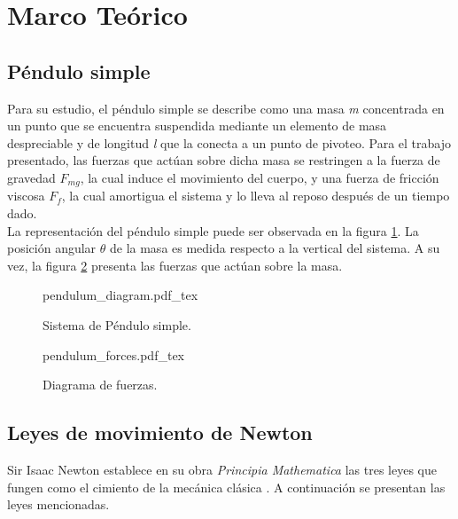 \section{Marco Teórico}

\subsection{Péndulo simple}

Para su estudio, el péndulo simple se describe como una masa 
\emph{m} concentrada en un punto \cite{sastry2013nonlinear} 
que se encuentra suspendida mediante un elemento de masa 
despreciable y de longitud \emph{l} que la conecta a un 
punto de pivoteo.
Para el trabajo presentado, las fuerzas que actúan
sobre dicha masa se restringen a la fuerza de gravedad $F_{mg}$, 
la cual induce el movimiento del cuerpo, y una
fuerza de fricción viscosa $F_f$, la cual amortigua el sistema
y lo lleva al reposo después de un tiempo dado.\\

La representación del péndulo simple puede ser observada en la
figura \ref{fig: simple pendulum}. 
La posición angular $\theta$ de la masa es medida 
respecto a la vertical del sistema.
A su vez, la figura \ref{fig: pendulum forces} presenta las fuerzas que
actúan sobre la masa.

\begin{figure}[ht]
    \centering
    {pendulum_diagram.pdf_tex}
    \caption{Sistema de Péndulo simple.}
    \label{fig: simple pendulum}
\end{figure}

 \begin{figure}[ht]
    \centering
    {pendulum_forces.pdf_tex}
    \caption{Diagrama de fuerzas.}
    \label{fig: pendulum forces}
\end{figure}


\subsection{Leyes de movimiento de Newton}

Sir Isaac Newton establece en su obra \emph{Principia Mathematica} 
las tres leyes que fungen como el cimiento de la mecánica clásica 
\cite{newton1803mathematical, díaz20183d}. 
A continuación se presentan las leyes mencionadas.

